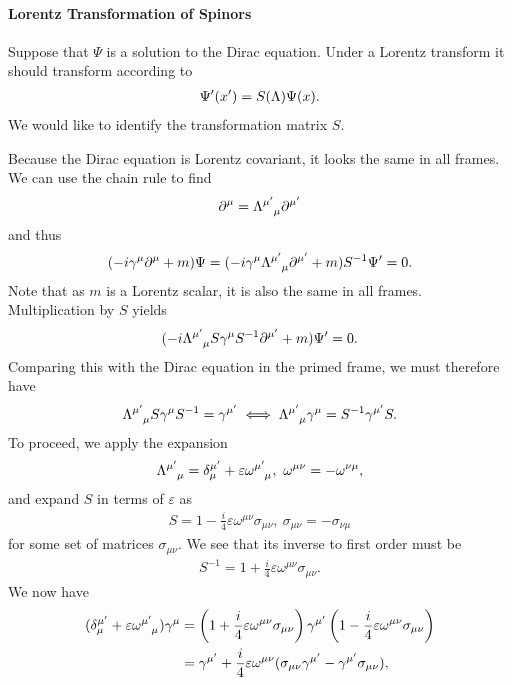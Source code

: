 \paragraph{Lorentz Transformation of Spinors}
Suppose that $\Psi$ is a solution to the Dirac equation. Under a Lorentz transform it should transform according to
\begin{align*}
	\Psi^{\prime}(x^{\prime}) = S(\Lambda)\Psi(x).
\end{align*}
We would like to identify the transformation matrix $S$.

Because the Dirac equation is Lorentz covariant, it looks the same in all frames. We can use the chain rule to find
\begin{align*}
	\del{\mu}{} = \tensor{\Lambda}{^{\mu\p}_{\mu}}\del{\mu\p}{}
\end{align*}
and thus
\begin{align*}
	(-i\gamma^{\mu}\del{\mu}{} + m)\Psi = (-i\gamma^{\mu}\tensor{\Lambda}{^{\mu\p}_{\mu}}\del{\mu\p}{} + m)S^{-1}\Psi\p = 0.
\end{align*}
Note that as $m$ is a Lorentz scalar, it is also the same in all frames. Multiplication by $S$ yields
\begin{align*}
	(-i\tensor{\Lambda}{^{\mu\p}_{\mu}}S\gamma^{\mu}S^{-1}\del{\mu\p}{} + m)\Psi\p = 0.
\end{align*}
Comparing this with the Dirac equation in the primed frame, we must therefore have
\begin{align*}
	\tensor{\Lambda}{^{\mu\p}_{\mu}}S\gamma^{\mu}S^{-1} = \gamma^{\mu\p} \iff \tensor{\Lambda}{^{\mu\p}_{\mu}}\gamma^{\mu} = S^{-1}\gamma^{\mu\p}S.
\end{align*}
To proceed, we apply the expansion
\begin{align*}
	\tensor{\Lambda}{^{\mu\p}_{\mu}} = \kdelta{\mu\p}{\mu} + \varepsilon\tensor{\omega}{^{\mu\p}_{\mu}},\ \omega^{\mu\nu} = -\omega^{\nu\mu},
\end{align*}
and expand $S$ in terms of $\varepsilon$ as
\begin{align*}
	S = 1 - \frac{i}{4}\varepsilon\omega^{\mu\nu}\sigma_{\mu\nu},\ \sigma_{\mu\nu} = -\sigma_{\nu\mu}
\end{align*}
for some set of matrices $\sigma_{\mu\nu}$. We see that its inverse to first order must be
\begin{align*}
	S^{-1} = 1 + \frac{i}{4}\varepsilon\omega^{\mu\nu}\sigma_{\mu\nu}.
\end{align*}
We now have
\begin{align*}
	(\kdelta{\mu\p}{\mu} + \varepsilon\tensor{\omega}{^{\mu\p}_{\mu}})\gamma^{\mu} &= \left(1 + \frac{i}{4}\varepsilon\omega^{\mu\nu}\sigma_{\mu\nu}\right)\gamma^{\mu\p}\left(1 - \frac{i}{4}\varepsilon\omega^{\mu\nu}\sigma_{\mu\nu}\right) \\
	&= \gamma^{\mu\p} + \frac{i}{4}\varepsilon\omega^{\mu\nu}(\sigma_{\mu\nu}\gamma^{\mu\p} - \gamma^{\mu\p}\sigma_{\mu\nu}),
\end{align*}
